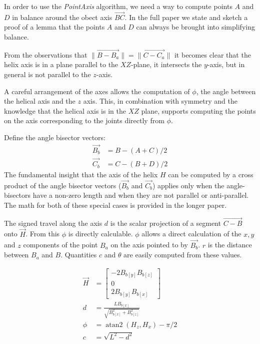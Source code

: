 \documentclass{svproc}
\DeclareMathOperator{\atantwo}{atan2}
\begin{document}
In order to use the {\em PointAxis} algorithm, we need a way
to compute points $A$ and $D$ in balance around the obect axis $\overrightarrow{BC}$. In the full paper\cite{readfullsegmentedhelix}
we state and sketch a proof of a lemma that the points $A$ and $D$ can always be brought into simplifying balance.

From the observations that $\| \overrightarrow{B - B_a} \| = \| \overrightarrow{C - C_a} \|$
it becomes clear that the helix axis is in a plane
parallel to the $XZ$-plane, it intersects the $y$-axis, but in general is
not parallel to the $z$-axis.

A careful arrangement of the axes
allows the computation of $\phi$, the angle between the helical axis
and the $z$ axis. This, in combination with symmetry and the knowledge
that the helical axis is in the $XZ$ plane, supports computing the
points on the axis corresponding to the joints directly from $\phi$.

Define the angle bisector vectors:
\begin{align}
  \overrightarrow{B_b} &= B - (A + C)/2 \\
  \overrightarrow{C_b} &= C - (B + D)/2
  \end{align}
The fundamental insight that the axis of the helix $H$ can be
computed by a cross product of the angle bisector
vectors ($\overrightarrow{B_b}$ and $\overrightarrow{C_b}$) applies only
when the angle-bisectors have a non-zero length and when
they are not parallel or anti-parallel.
The math for both of these special cases is provided in the longer paper\cite{readfullsegmentedhelix}.

The signed travel along the axis $d$ is
the scalar projection of a segment $\overrightarrow{C - B}$ onto $\overrightarrow{H}$.
From this $\phi$ is directly calculable. $\phi$ allows
a direct calculation of the $x,y$ and $z$ components of the
point $B_a$ on the axis pointed to by $\overrightarrow{B_b}$.
$r$ is the distance between $B_a$ and $B$. Quantities $c$ and $\theta$
are easily computed from these values.

\begin{align}
  \overrightarrow{H} &=  \begin{bmatrix} -2 B_{b[y]} B_{b[z]} \\ 0 \\ 2 B_{b[y]} B_{b[x]}  \end{bmatrix} \\
  d &= \frac{L B_{b[x]}}{\sqrt{B_{b[x]}^2 + B_{b[z]}^2}}  \\
  \phi &= \atantwo{(H_z,H_x)} - \pi/2  \\
  c &= \sqrt{L^2 - d^2}
\end{align}
\end{document}
